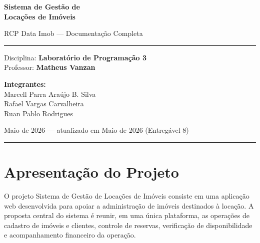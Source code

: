 \documentclass[12pt, a4paper]{article}
\begin{document}
\begin{titlepage}
  \centering
  \vspace*{3cm}

  {\fontsize{36}{44}\selectfont\bfseries\color{teal} Sistema de Gestão de\\[6pt]}
  {\fontsize{36}{44}\selectfont\bfseries\color{black} Locações de Imóveis\\[20pt]}

  {\large\color{gray60} RCP Data Imob — Documentação Completa}

  \vspace{2cm}
  \color{gray30}\rule{0.6\textwidth}{0.4pt}\color{black}
  \vspace{1.5cm}

  {\normalsize Disciplina: \textbf{Laboratório de Programação 3}}\\[4pt]
  {\normalsize Professor: \textbf{Matheus Vanzan}}

  \vspace{1.5cm}

  {\normalsize\bfseries Integrantes:}\\[6pt]
  {\normalsize Marcell Parra Araújo B. Silva}\\[3pt]
  {\normalsize Rafael Vargas Carvalheira}\\[3pt]
  {\normalsize Ruan Pablo Rodrigues}

  \vspace{1.5cm}

  {\normalsize\color{teal} Maio de 2026 — atualizado em Maio de 2026 (Entregável 8)}

  \vfill
  \color{gray30}\rule{0.6\textwidth}{0.4pt}
\end{titlepage}

\tableofcontents
\newpage

\section{Apresentação do Projeto}

O projeto Sistema de Gestão de Locações de Imóveis consiste em uma aplicação web desenvolvida para apoiar a administração de imóveis destinados à locação. A proposta central do sistema é reunir, em uma única plataforma, as operações de cadastro de imóveis e clientes, controle de reservas, verificação de disponibilidade e acompanhamento financeiro da operação.
\end{document}
